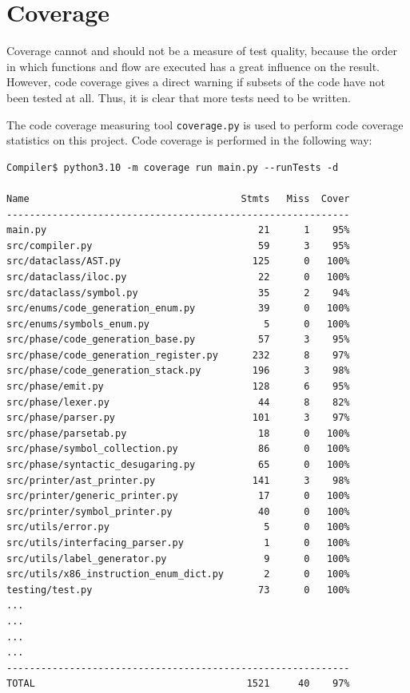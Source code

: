 \section{Coverage}
Coverage cannot and should not be a measure of test quality, because the order in which functions and flow are executed has a great influence on the result. However, code coverage gives a direct warning if subsets of the code have not been tested at all. Thus, it is clear that more tests need to be written.

The code coverage measuring tool \texttt{coverage.py} is used to perform code coverage statistics on this project. Code coverage is performed in the following way:

\begin{verbatim}
Compiler$ python3.10 -m coverage run main.py --runTests -d

Name                                     Stmts   Miss  Cover
------------------------------------------------------------
main.py                                     21      1    95%
src/compiler.py                             59      3    95%
src/dataclass/AST.py                       125      0   100%
src/dataclass/iloc.py                       22      0   100%
src/dataclass/symbol.py                     35      2    94%
src/enums/code_generation_enum.py           39      0   100%
src/enums/symbols_enum.py                    5      0   100%
src/phase/code_generation_base.py           57      3    95%
src/phase/code_generation_register.py      232      8    97%
src/phase/code_generation_stack.py         196      3    98%
src/phase/emit.py                          128      6    95%
src/phase/lexer.py                          44      8    82%
src/phase/parser.py                        101      3    97%
src/phase/parsetab.py                       18      0   100%
src/phase/symbol_collection.py              86      0   100%
src/phase/syntactic_desugaring.py           65      0   100%
src/printer/ast_printer.py                 141      3    98%
src/printer/generic_printer.py              17      0   100%
src/printer/symbol_printer.py               40      0   100%
src/utils/error.py                           5      0   100%
src/utils/interfacing_parser.py              1      0   100%
src/utils/label_generator.py                 9      0   100%
src/utils/x86_instruction_enum_dict.py       2      0   100%
testing/test.py                             73      0   100%
... 
... 
... 
...
------------------------------------------------------------
TOTAL                                     1521     40    97%
\end{verbatim}

